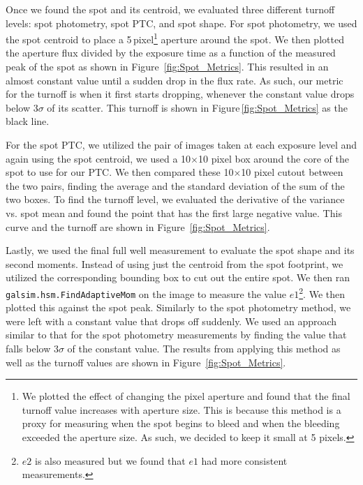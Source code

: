 Once we found the spot and its centroid, we evaluated three different turnoff levels: spot photometry, spot PTC, and spot shape.
For spot photometry, we used the spot centroid to place a 5\,pixel\footnote{We plotted the effect of changing the pixel aperture and found that the final turnoff value increases with aperture size. This is because this method is a proxy for measuring when the spot begins to bleed and when the bleeding exceeded the aperture size. As such, we decided to keep it small at 5 pixels.} aperture around the spot. We then plotted the aperture flux divided by the exposure time as a function of the measured peak of the spot as shown in Figure~\ref{fig:Spot_Metrics}. This resulted in an almost constant value until a sudden drop in the flux rate. As such, our metric for the turnoff is when it first starts dropping, whenever the constant value drops below $3\sigma$ of its scatter. This turnoff is shown in Figure\,\ref{fig:Spot_Metrics} as the black line.

For the spot PTC, we utilized the pair of images taken at each exposure level and again using the spot centroid, we used a 10$\times$10 pixel box around the core of the spot to use for our PTC. We then compared these 10$\times$10 pixel cutout between the two pairs, finding the average and the standard deviation of the sum of the two boxes. To find the turnoff level, we evaluated the derivative of the variance vs. spot mean and found the point that has the first large negative value. This curve and the turnoff are shown in Figure~\ref{fig:Spot_Metrics}.

Lastly, we used the final full well measurement to evaluate the spot shape and its second moments. Instead of using just the centroid from the spot footprint, we utilized the corresponding bounding box to cut out the entire spot. We then ran \texttt{galsim.hsm.FindAdaptiveMom} on the image to measure the value $e1$\footnote{$e2$ is also measured but we found that $e1$ had more consistent measurements.}. We then plotted this against the spot peak. Similarly to the spot photometry method, we were left with a constant value that drops off suddenly. We used an approach similar to that for the spot photometry measurements by finding the value that falls below $3\sigma$ of the constant value. The results from applying this method as well as the turnoff values are shown in Figure~\ref{fig:Spot_Metrics}.


